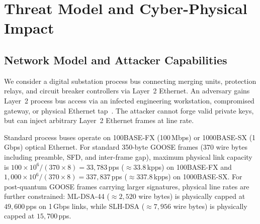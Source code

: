 \documentclass[journal]{IEEEtran}
\begin{document}
\begin{table}[t]
\centering
\caption{Comparison with Related Research}
\label{tab:related_work}
\scriptsize
{}
\end{table}

\section{Threat Model and Cyber-Physical Impact}
\label{sec:threat_model}

\subsection{Network Model and Attacker Capabilities}
We consider a digital substation process bus connecting merging units, protection relays, and circuit breaker controllers via Layer~2 Ethernet. An adversary gains Layer~2 process bus access via an infected engineering workstation, compromised gateway, or physical Ethernet tap~\cite{cherepanov2017industroyer}. The attacker cannot forge valid private keys, but can inject arbitrary Layer~2 Ethernet frames at line rate.

Standard process buses operate on 100BASE-FX (100\,Mbps) or 1000BASE-SX (1\,Gbps) optical Ethernet. For standard 350-byte GOOSE frames (370 wire bytes including preamble, SFD, and inter-frame gap), maximum physical link capacity is $100 \times 10^6 / (370 \times 8) = 33{,}783$\,pps ($\approx 33.8$\,kpps) on 100BASE-FX and $1{,}000 \times 10^6 / (370 \times 8) = 337{,}837$\,pps ($\approx 337.8$\,kpps) on 1000BASE-SX. For post-quantum GOOSE frames carrying larger signatures, physical line rates are further constrained: ML-DSA-44 ($\approx 2{,}520$ wire bytes) is physically capped at $49{,}600$\,pps on 1\,Gbps links, while SLH-DSA ($\approx 7{,}956$ wire bytes) is physically capped at $15{,}700$\,pps.
\end{document}
